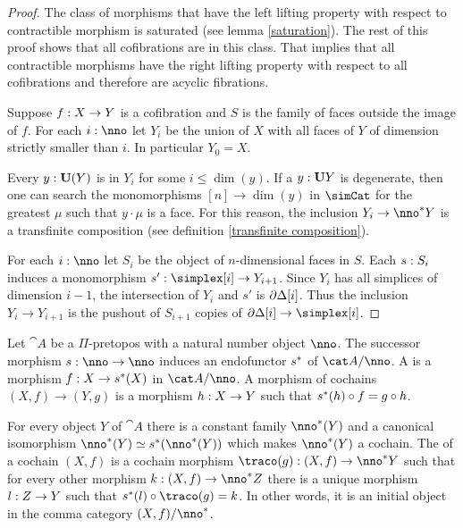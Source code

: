 \documentclass[csh.tex]{subfiles}
\begin{document}
\begin{proof} The class of morphisms that have the left lifting property with respect to contractible morphism is saturated (see lemma \ref{saturation}). The rest of this proof shows that all cofibrations are in this class. That implies that all contractible morphisms have the right lifting property with respect to all cofibrations and therefore are acyclic fibrations.

Suppose $f: X\to Y$ is a cofibration and $S$ is the family of faces outside the image of $f$. For each $i\of\nno$ let $Y_i$ be the union of $X$ with all faces of $Y$ of dimension strictly smaller than $i$. In particular $Y_0=X$.

Every $y:\mathbf{U}(Y)$ is in $Y_i$ for some $i\leq \dim(y)$. If a $y:\mathbf{U} Y$ is degenerate, then one can search the monomorphisms $[n]\to\dim(y)$ in $\simCat$ for the greatest $\mu$ such that $y\cdot\mu$ is a face. For this reason, the inclusion $Y_i\to\nno\ri Y$ is a transfinite composition (see definition \ref{transfinite composition}).

For each $i\of\nno$ let $S_i$ be the object of $n$-dimensional faces in $S$. Each $s: S_i$ induces a monomorphism $s'\of\simplex[i]\to Y_{i+1}$. Since $Y_{i}$ has all simplices of dimension $i-1$, the intersection of $Y_i$ and $s'$ is $\partial\Delta[i]$. Thus the inclusion $Y_i\to Y_{i+1}$ is the pushout of $S_{i+1}$ copies of $\cycle[i]\to\simplex[i]$.
\end{proof}

\begin{definition} Let $\cat A$ be a $\Pi$-pretopos with a natural number object $\nno$. The successor morphism $s\of\nno\to\nno$ induces an endofunctor $s^*$ of $\cat A/\nno$. A  is a morphism $f: X\to s^*(X)$ in $\cat A/\nno$. A morphism of cochains $(X,f)\to(Y,g)$ is a morphism $h: X\to Y$ such that $s^*(h)\circ f = g\circ h$.

For every object $Y$ of $\cat A$ there is a constant family $\nno\ri(Y)$ and a canonical isomorphism $\nno\ri(Y)\simeq s\ri(\nno\ri(Y))$ which makes $\nno\ri(Y)$ a cochain. The  of a cochain $(X,f)$ is a cochain morphism $\traco(g)\of (X,f)\to\nno\ri Y$ such that for every other morphism $k\of (X,f)\to\nno\ri Z$ there is a unique morphism $l: Z\to Y$ such that $s\ri(l)\circ \traco(g)=k$. In other words, it is an initial object in the comma category $(X,f)/\nno\ri$.
\end{definition}
\end{document}
